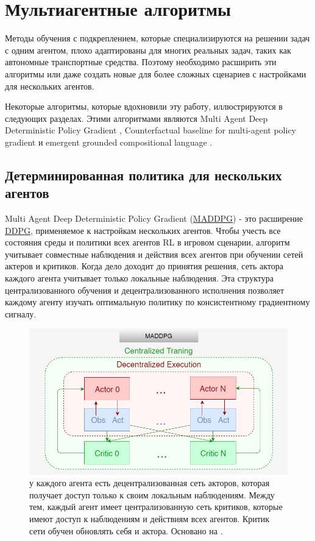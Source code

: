 \section{Мультиагентные алгоритмы} \label{ch2:ma-algs} %

Методы обучения с подкреплением, которые специализируются на решении задач с одним агентом, плохо адаптированы для многих реальных задач, таких как автономные транспортные средства. Поэтому необходимо расширить эти алгоритмы или даже создать новые для более сложных сценариев с настройками для нескольких агентов.

Некоторые алгоритмы, которые вдохновили эту работу, иллюстрируются в следующих разделах. Этими алгоритмами являются Multi Agent Deep Deterministic Policy Gradient \cite{lowe2017multiagent}, Counterfactual baseline for multi-agent policy gradient \cite{foerster2017counterfactual} и emergent grounded compositional language \cite{mordatch2017emergence}.

\subsection{Детерминированная политика для нескольких агентов}

Multi Agent Deep Deterministic Policy Gradient (\hyperref[acr:maddpg]{MADDPG}) - это расширение \hyperref[acr:ddpg]{DDPG}, применяемое к настройкам нескольких агентов. Чтобы учесть все состояния среды и политики всех агентов RL в игровом сценарии, алгоритм учитывает совместные наблюдения и действия всех агентов при обучении сетей актеров и критиков. Когда дело доходит до принятия решения, сеть актора каждого агента учитывает только локальные наблюдения. Эта структура централизованного обучения и децентрализованного исполнения позволяет каждому агенту изучать оптимальную политику по консистентному градиентному сигналу. \cite{lowe2017multiagent}

\begin{figure}[ht!]
    \center
    \includegraphics [scale=0.80] {my_folder/images/ch2/maddpg.png}
    \caption{у каждого агента есть децентрализованная сеть акторов, которая получает доступ только к своим локальным наблюдениям. Между тем, каждый агент имеет централизованную сеть критиков, которые имеют доступ к наблюдениям и действиям всех агентов. Критик сети обучен обновлять себя и актора. Основано на \cite{lowe2017multiagent}.}
    \label{fig:ch2-maddpg}
\end{figure} %

